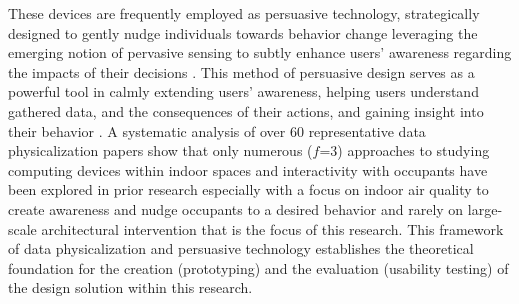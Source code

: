These devices are frequently employed as persuasive technology, strategically designed to gently nudge individuals towards behavior change leveraging the emerging notion of pervasive sensing to subtly enhance users' awareness regarding the impacts of their decisions \cite{bader_windowwall_2019, rogers_ambient_2010}. This method of persuasive design serves as a powerful tool in calmly extending users' awareness, helping users understand gathered data, and the consequences of their actions, and gaining insight into their behavior \cite{bae_making_2022}. A systematic analysis of over 60 representative data physicalization papers \cite{sauve_physecology_2022} show that only numerous ($f$=3) approaches to studying computing devices within indoor spaces and interactivity with occupants have been explored in prior research especially with a focus on indoor air quality to create awareness and nudge occupants to a desired behavior and rarely on large-scale architectural intervention that is the focus of this research.
This framework of data physicalization and persuasive technology establishes the theoretical foundation for the creation (prototyping) and the evaluation (usability testing) of the design solution within this research.